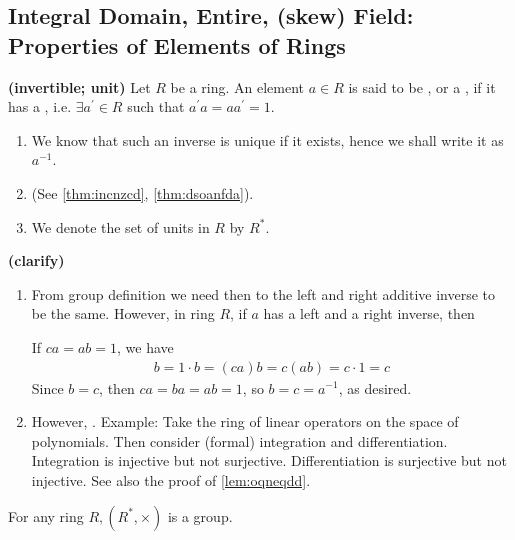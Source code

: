 \documentclass{article}
\newcommand{\bfs}[1]{\textbf{({#1}) }}
\begin{document}
\subsection{Integral Domain, Entire, (skew) Field: Properties of Elements of Rings}\label{sec:Entire}

\begin{defa}\bfs{invertible; unit}
  Let $R$ be a ring. An element $a \in R$ is said to be , or a , if it has a , i.e. $\exists a^{\prime} \in R$ such that $a^{\prime} a=a a^{\prime}=1$. \begin{enumerate}
      \item We know that such an inverse is unique if it exists, hence we shall write it as $a^{-1}$. 
      \item {} (See \cref{thm:incnzcd}, \cref{thm:dsoanfda}).
      \item We denote the set of units in $R$ by $R^{*}$.
  \end{enumerate}
\end{defa} 
\begin{rema}\bfs{clarify}
\begin{enumerate}
\item From group definition we need then to the left and right additive inverse to be the same. However, in  ring $R$, if $a$ has  a left and a right inverse, then 

If $ca=ab=1$, we have
\begin{align*}
b=1 \cdot b=(c a) b=c(a b)=c \cdot 1=c
\end{align*}
Since $b=c$, then $c a=b a=a b=1$, so $b=c=a^{-1}$, as desired.
    \item However, . Example: Take the ring of linear operators on the space of polynomials. Then consider (formal) integration and differentiation. Integration is injective but not surjective. Differentiation is surjective but not injective. See also the proof of \cref{lem:oqneqdd}.
\end{enumerate}
\end{rema}
\begin{lema}\label{lem:omdnqnbee}
For any ring $R,\left(R^{*}, \times\right)$ is a group.
\end{lema}
\end{document}

